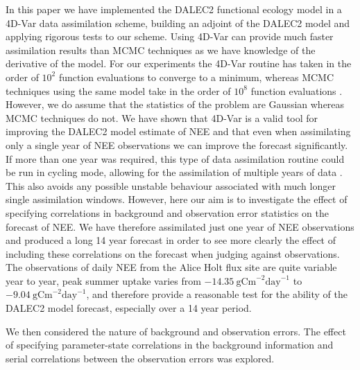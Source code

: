 In this paper we have implemented the DALEC2 functional ecology model in a 4D-Var data assimilation scheme, building an adjoint of the DALEC2 model and applying rigorous tests to our scheme. Using 4D-Var can provide much faster assimilation results than MCMC techniques as we have knowledge of the derivative of the model. For our experiments the 4D-Var routine has taken in the order of $10^{2}$ function evaluations to converge to a minimum, whereas MCMC techniques using the same model take in the order of $10^{8}$ function evaluations \citep{Bloom2015}. However, we do assume that the statistics of the problem are Gaussian whereas MCMC techniques do not. We have shown that 4D-Var is a valid tool for improving the DALEC2 model estimate of NEE and that even when assimilating only a single year of NEE observations we can improve the forecast significantly. If more than one year was required, this type of data assimilation routine could be run in cycling mode, allowing for the assimilation of multiple years of data \citep{moodycycled4dvar}. This also avoids any possible unstable behaviour associated with much longer single assimilation windows. However, here our aim is to investigate the effect of specifying correlations in background and observation error statistics on the forecast of NEE. We have therefore assimilated just one year of NEE observations and produced a long 14 year forecast in order to see more clearly the effect of including these correlations on the forecast when judging against observations. The observations of daily NEE from the Alice Holt flux site are quite variable year to year, peak summer uptake varies from $-14.35~\text{gCm}^{-2}\text{day}^{-1}$ to $-9.04~\text{gCm}^{-2}\text{day}^{-1}$, and therefore provide a reasonable test for the ability of the DALEC2 model forecast, especially over a 14 year period.  

We then considered the nature of background and observation errors. The effect of specifying parameter-state correlations in the background information and serial correlations between the observation errors was explored.

